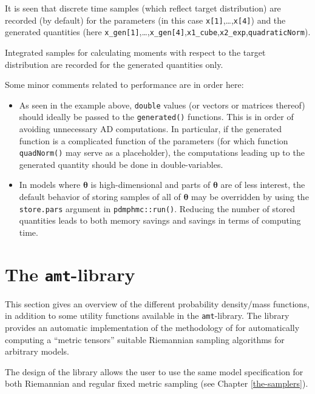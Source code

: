 \documentclass[
]{book}
\begin{document}
It is seen that discrete time samples (which reflect target distribution) are recorded (by default) for the parameters (in this case \texttt{x{[}1{]}},\ldots,\texttt{x{[}4{]}}) and the generated quantities (here \texttt{x\_gen{[}1{]}},\ldots,\texttt{x\_gen{[}4{]}},\texttt{x1\_cube},\texttt{x2\_exp},\texttt{quadraticNorm}).

Integrated samples for calculating moments with respect to the target distribution are recorded for the generated quantities only.

Some minor comments related to performance are in order here:

\begin{itemize}
\item
  As seen in the example above, \texttt{double} values (or vectors or matrices thereof) should ideally be passed to the \texttt{generated()} functions. This is in order of avoiding unnecessary AD computations. In particular, if the generated function is a complicated function of the parameters (for which function \texttt{quadNorm()} may serve as a placeholder), the computations leading up to the generated quantity should be done in double-variables.
\item
  In models where \(\boldsymbol \theta\) is high-dimensional and parts of \(\boldsymbol \theta\) are of less interest, the default behavior of storing samples of all of \(\boldsymbol \theta\) may be overridden by using the \texttt{store.pars} argument in \texttt{pdmphmc::run()}. Reducing the number of stored quantities leads to both memory savings and savings in terms of computing time.
\end{itemize}

\hypertarget{amt-lib}{%
\chapter{\texorpdfstring{The \texttt{amt}-library}{The amt-library}}\label{amt-lib}}

This section gives an overview of the different probability density/mass functions, in addition to some utility functions available in the \texttt{amt}-library. The library provides an automatic
implementation of the methodology of \citet{kleppe_amt} for automatically computing a ``metric tensors'' suitable Riemannian sampling algorithms for arbitrary models.

The design of the library allows the user to use the same model specification for both Riemannian and regular fixed metric sampling (see Chapter \ref{the-samplers}).
\end{document}
